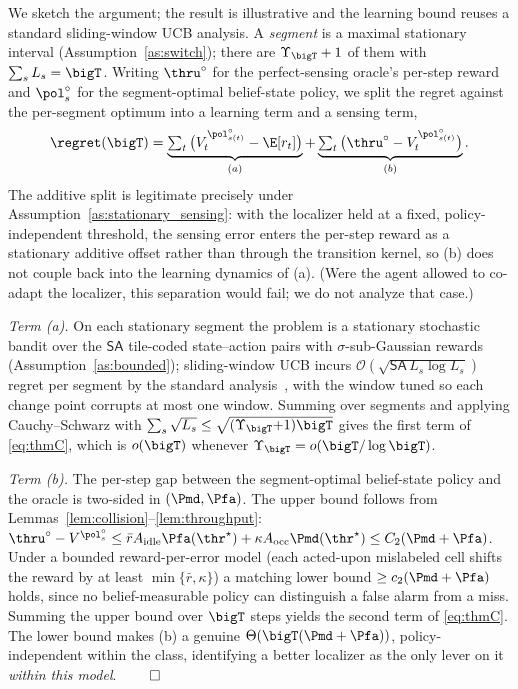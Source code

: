 We sketch the argument; the result is illustrative and the learning bound
reuses a standard sliding-window UCB analysis. A \emph{segment} is a maximal
stationary interval (Assumption~\ref{as:switch}); there are
$\Upsilon_{\bigT}+1$ of them with $\sum_s L_s=\bigT$. Writing $\thru^{\circ}$
for the perfect-sensing oracle's per-step reward and $\pol^{\circ}_s$ for the
segment-optimal belief-state policy, we split the regret against the
per-segment optimum into a learning term and a sensing term,
\begin{equation}
\regret(\bigT)=
\underbrace{\textstyle\sum_{t}\big(V^{\pol^{\circ}_{s(t)}}_t-\E[r_t]\big)}_{(a)}
+\underbrace{\textstyle\sum_{t}\big(\thru^{\circ}-V^{\pol^{\circ}_{s(t)}}_t\big)}_{(b)}.
\label{eq:appC_decomp}
\end{equation}
The additive split is legitimate precisely under
Assumption~\ref{as:stationary_sensing}: with the localizer held at a fixed,
policy-independent threshold, the sensing error enters the per-step reward as
a stationary additive offset rather than through the transition kernel, so (b)
does not couple back into the learning dynamics of (a). (Were the agent
allowed to co-adapt the localizer, this separation would fail; we do not
analyze that case.)

\emph{Term (a).} On each stationary segment the problem is a stationary
stochastic bandit over the $\mathsf{SA}$ tile-coded state--action pairs with
$\sigma$-sub-Gaussian rewards (Assumption~\ref{as:bounded}); sliding-window
UCB incurs $\mathcal{O}(\sqrt{\mathsf{SA}\,L_s\log L_s})$ regret per segment by
the standard analysis~\cite{garivier2011ucb}, with the window tuned so each
change point corrupts at most one window. Summing over segments and applying
Cauchy--Schwarz with $\sum_s\sqrt{L_s}\le\sqrt{(\Upsilon_{\bigT}{+}1)\bigT}$
gives the first term of \eqref{eq:thmC}, which is $o(\bigT)$ whenever
$\Upsilon_{\bigT}=o(\bigT/\log\bigT)$.

\emph{Term (b).} The per-step gap between the segment-optimal belief-state
policy and the oracle is two-sided in $(\Pmd,\Pfa)$. The upper bound follows
from Lemmas~\ref{lem:collision}--\ref{lem:throughput}:
$\thru^{\circ}-V^{\pol^{\circ}_s}\le \bar r A_{\mathrm{idle}}\Pfa(\thr^\star)
+\kappa A_{\mathrm{occ}}\Pmd(\thr^\star)\le C_2(\Pmd+\Pfa)$. Under a
bounded reward-per-error model (each acted-upon mislabeled cell shifts the
reward by at least $\min\{\bar r,\kappa\}$) a matching lower bound
$\ge c_2(\Pmd+\Pfa)$ holds, since no belief-measurable policy can distinguish
a false alarm from a miss. Summing the upper bound over $\bigT$ steps yields
the second term of \eqref{eq:thmC}. The lower bound makes (b) a genuine
$\Theta(\bigT(\Pmd+\Pfa))$, policy-independent within the class, identifying a
better localizer as the only lever on it \emph{within this model}.
\hfill$\qed$

